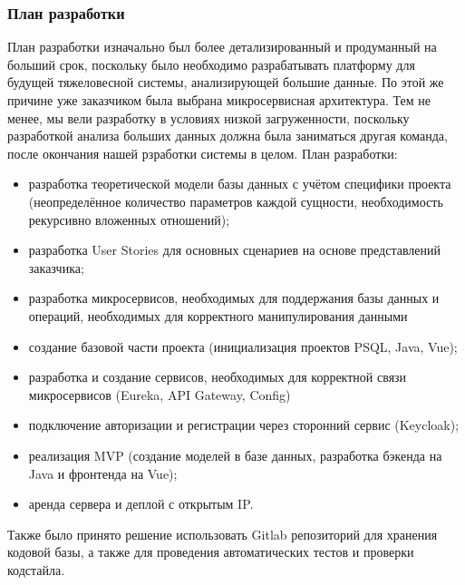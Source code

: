     \subsubsection{План разработки}
    План разработки изначально был более детализированный и продуманный на больший срок, поскольку было необходимо разрабатывать платформу для будущей тяжеловесной системы, анализирующей большие данные. По этой же причине уже заказчиком была выбрана микросервисная архитектура. Тем не менее, мы вели разработку в условиях низкой загруженности, поскольку разработкой анализа больших данных должна была заниматься другая команда, после окончания нашей рзработки системы в целом. План разработки:
    \begin{itemize}
        \item разработка теоретической модели базы данных с учётом специфики проекта (неопределённое количество параметров каждой сущности, необходимость рекурсивно вложенных отношений);
        \item разработка User Stories для основных сценариев на основе представлений заказчика;
        \item разработка микросервисов, необходимых для поддержания базы данных и операций, необходимых для корректного манипулирования данными
        \item создание базовой части проекта (инициализация проектов PSQL, Java, Vue);
        \item разработка и создание сервисов, необходимых для корректной связи микросервисов (Eureka, API Gateway, Config)
        \item подключение авторизации и регистрации через сторонний сервис (Keycloak);
        \item реализация MVP (создание моделей в базе данных, разработка бэкенда на Java и фронтенда на Vue);
        \item аренда сервера и деплой с открытым IP.
    \end{itemize}
    Также было принято решение использовать Gitlab репозиторий для хранения кодовой базы, а также для проведения автоматических тестов и проверки кодстайла.

